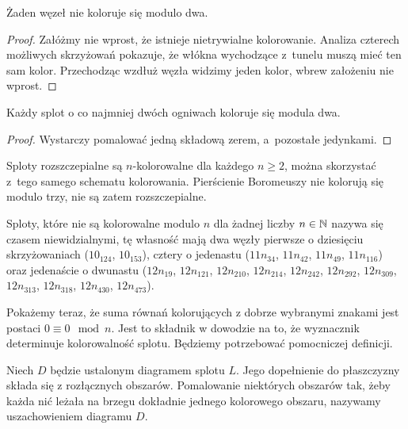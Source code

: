 \begin{proposition}
\label{prp:no_colourings_mod_2}%
    Żaden węzeł nie koloruje się modulo dwa.
\end{proposition}

\begin{proof}
    Załóżmy nie wprost, że istnieje nietrywialne kolorowanie.
    Analiza czterech możliwych skrzyżowań pokazuje, że włókna wychodzące z~tunelu muszą mieć ten sam kolor.
    Przechodząc wzdłuż węzła widzimy jeden kolor, wbrew założeniu nie wprost.
\end{proof}

\begin{proposition}
\label{prp:links_colouring_like_a_lot}%
    Każdy splot o co najmniej dwóch ogniwach koloruje się modula dwa.
\end{proposition}

\begin{proof}
    Wystarczy pomalować jedną składową zerem, a~pozostałe jedynkami.
\end{proof}

Sploty rozszczepialne są $n$-kolorowalne dla każdego $n \ge 2$, można skorzystać z~tego samego schematu kolorowania.
%
Pierścienie Boromeuszy nie kolorują się modulo trzy, nie są zatem rozszczepialne.
\label{boromean_not_splittable}%
%

Sploty, które nie są kolorowalne modulo $n$ dla żadnej liczby $n \in \mathbb N$ nazywa się czasem niewidzialnymi, tę własność mają dwa węzły pierwsze o dziesięciu skrzyżowaniach ($10_{124}$, $10_{153}$), cztery o jedenastu ($11n_{34}$, $11n_{42}$, $11n_{49}$, $11n_{116}$) oraz jedenaście o dwunastu ($12n_{19}$, $12n_{121}$, $12n_{210}$, $12n_{214}$, $12n_{242}$, $12n_{292}$, $12n_{309}$, $12n_{313}$, $12n_{318}$, $12n_{430}$, $12n_{473}$).
%

Pokażemy teraz, że suma równań kolorujących z dobrze wybranymi znakami jest postaci $0 \equiv 0 \mod n$.
Jest to składnik w dowodzie na to, że wyznacznik determinuje kolorowalność splotu.
Będziemy potrzebować pomocniczej definicji.

\begin{definition}[uszachowienie]
%
    Niech $D$ będzie ustalonym diagramem splotu $L$.
    Jego dopełnienie do płaszczyzny składa się z rozłącznych obszarów.
    Pomalowanie niektórych obszarów tak, żeby każda nić leżała na brzegu dokładnie jednego kolorowego obszaru, nazywamy uszachowieniem diagramu $D$.
\end{definition}


